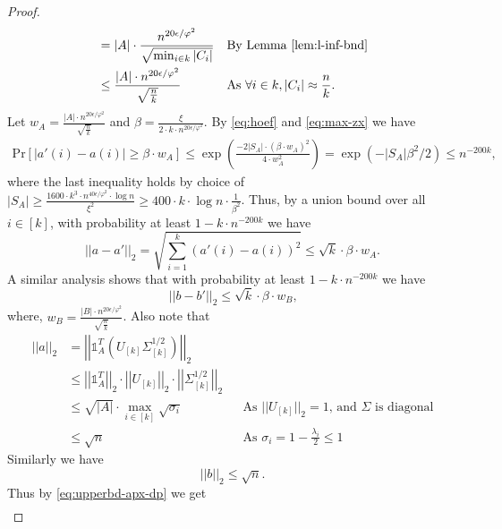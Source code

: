 \documentclass[letterpaper,11pt]{article}
\theoremstyle{plain}
\theoremstyle{definition}
\theoremstyle{remark}
\newcommand{\e}{\epsilon}
\begin{document}
\begin{proof}
\begin{align}
		&= |A| \cdot\frac{n^{20 \e/\varphi^2}}{\sqrt{\min_{i\in k} |C_i|}} &&\text{By Lemma \ref{lem:l-inf-bnd}} \nonumber\\
		&\leq \frac{|A|\cdot n^{20 \e/\varphi^2}}{\sqrt{\frac{n}{k}}} &&\text{As $\forall i\in k, |C_i| \approx \frac{n}{k}$}. 
	\end{align}
	Let $w_A=   \frac{|A|\cdot n^{20 \e/\varphi^2}}{\sqrt{\frac{n}{k}}}$ and $\beta = \frac{\xi}{2\cdot k \cdot n^{20 \e/\varphi^2}}$. By \eqref{eq:hoef} and \eqref{eq:max-zx} we have
	\begin{align*}
	\text{Pr} \left[|a'(i) - a(i)| \geq \beta\cdot w_A \right] \leq \exp\left(\frac{-2|S_A| \cdot (\beta\cdot w_A)^2}{4\cdot w_A^2 }\right) = \exp\left(-|S_A| \beta^2/2\right) \leq n^{-200k}\text{,}
	\end{align*}
	where the last inequality holds by choice of $|S_A| \geq  \frac{1600\cdot k^3\cdot n^{40 \epsilon/\varphi^2}\cdot \log n}{\xi^2}\geq 400\cdot k\cdot \log n\cdot \frac{1}{\beta^2}$. Thus, by a union bound over all $i \in [k]$, with  probability at least $1-k\cdot n^{-200k}$ we have 
\begin{equation}
\label{eq:aa;}
||a-a'||_2=\sqrt{\sum_{i=1}^k (a'(i) - a(i))^2 }\leq \sqrt{k}\cdot \beta\cdot w_A.
\end{equation}	
A similar analysis shows that with  probability at least $1-k\cdot n^{-200k}$ we have 
\begin{equation}
\label{eq:bb'}
||b-b'||_2\leq \sqrt{k}\cdot \beta\cdot w_B\text{,}
\end{equation}	
where, $w_B=   \frac{|B|\cdot n^{20 \e/\varphi^2}}{\sqrt{\frac{n}{k}}}$. Also note that 
\begin{align}
\label{eq:anorm}
||a||_2 &= \left|\left|\mathds{1}_A^T \left(U_{[k]}\Sigma_{[k]}^{1/2}\right) \right|\right|_2 \nonumber\\
&\leq \left|\left| \mathds{1}_A^T   \right|\right|_2 \cdot \left|\left| U_{[k]} \right|\right|_2 \cdot \left|\left| \Sigma_{[k]}^{1/2}\right|\right|_2 \nonumber\\
&\leq \sqrt{|A|} \cdot \max_{i\in [k]}\sqrt{\sigma_i} &&\text{As $||U_{[k]}||_2=1$, and $\Sigma$ is diagonal} \nonumber\\
&\leq \sqrt{n}&&\text{As $\sigma_i=1-\frac{\lambda_i}{2}\leq 1$}
\end{align}
Similarly we have
\begin{equation}
\label{eq:bnorm}
||b||_2\leq   \sqrt{n}. 
\end{equation}
Thus by \eqref{eq:upperbd-apx-dp} we get
	\begin{align*}

\end{align*}
\end{proof}
\end{document}
